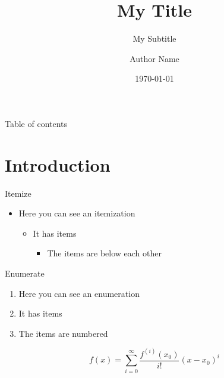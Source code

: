 \documentclass{beamer}
\author{Author Name}
\title{My Title}
\subtitle{My Subtitle}
\date{\today}
\begin{document}
\frame{\maketitle}


\begin{frame}{Table of contents}
	\tableofcontents
\end{frame}
		
\section{Introduction}
\begin{frame}{Itemize}
\begin{itemize}
\item Here you can see an itemization
\begin{itemize}
\item It has items
\begin{itemize}
\item The items are below each other
\end{itemize}
\end{itemize}
\end{itemize}
\end{frame}

\begin{frame}{Enumerate}
\begin{enumerate}
\item Here you can see an enumeration
\item It has items
\item The items are numbered
\end{enumerate}
\[
	f(x)=\sum_{i=0}^\infty \frac{f^{(i)}(x_0)}{i!}(x-x_0)^i
\]
\end{frame}
\end{document}
